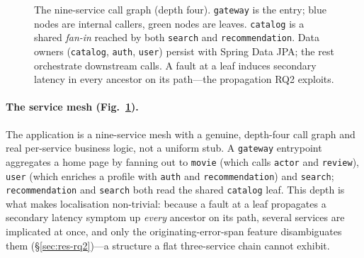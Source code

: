 \documentclass[pdflatex,sn-mathphys-num]{sn-jnl}%
\theoremstyle{thmstyleone}%
\theoremstyle{thmstyletwo}%
\theoremstyle{thmstylethree}%
\begin{document}
\begin{figure}[t]
\centering
{}
\caption{The nine-service call graph (depth four). \texttt{gateway} is the entry; blue
nodes are internal callers, green nodes are leaves. \texttt{catalog} is a shared
\emph{fan-in} reached by both \texttt{search} and \texttt{recommendation}. Data owners
(\texttt{catalog}, \texttt{auth}, \texttt{user}) persist with Spring Data JPA; the rest
orchestrate downstream calls. A fault at a leaf induces secondary latency in every
ancestor on its path---the propagation RQ2 exploits.}\label{fig:mesh}
\end{figure}

\paragraph{The service mesh (Fig.~\ref{fig:mesh}).} The application is a nine-service mesh with a genuine, depth-four call graph and real per-service business logic, not a uniform stub. A \texttt{gateway} entrypoint aggregates a home page by fanning out to \texttt{movie} (which calls \texttt{actor} and \texttt{review}), \texttt{user} (which enriches a profile with \texttt{auth} and \texttt{recommendation}) and \texttt{search}; \texttt{recommendation} and \texttt{search} both read the shared \texttt{catalog} leaf. This depth is what makes localisation non-trivial: because a fault at a leaf propagates a secondary latency symptom up \emph{every} ancestor on its path, several services are implicated at once, and only the originating-error-span feature disambiguates them (\S\ref{sec:res-rq2})---a structure a flat three-service chain cannot exhibit.
\end{document}
